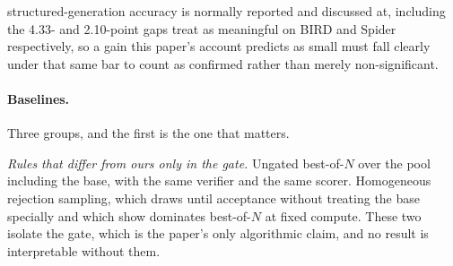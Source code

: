 \documentclass[11pt]{article}
\begin{document}
structured-generation accuracy is normally reported and discussed at, including the 4.33- and 2.10-point gaps \citet{gradesql2026} treat as meaningful on BIRD and Spider respectively, so a gain this paper's account predicts as small must fall clearly under that same bar to count as confirmed rather than merely non-significant.

\paragraph{Baselines.} Three groups, and the first is the one that matters.

\emph{Rules that differ from ours only in the gate.} Ungated best-of-$N$ over the pool including the base, with the same verifier and the same scorer. Homogeneous rejection sampling, which draws until acceptance without treating the base specially and which \citet{dorner2025rocnreroll} show dominates best-of-$N$ at fixed compute. These two isolate the gate, which is the paper's only algorithmic claim, and no result is interpretable without them.
\end{document}
